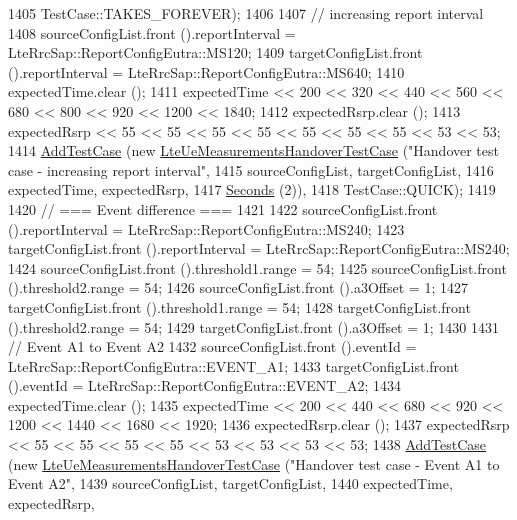\begin{DoxyCode}
1405                TestCase::TAKES\_FOREVER);
1406 
1407   \textcolor{comment}{// increasing report interval}
1408   sourceConfigList.front ().reportInterval = LteRrcSap::ReportConfigEutra::MS120;
1409   targetConfigList.front ().reportInterval = LteRrcSap::ReportConfigEutra::MS640;
1410   expectedTime.clear ();
1411   expectedTime << 200 << 320 << 440 << 560 << 680 << 800 << 920 << 1200 << 1840;
1412   expectedRsrp.clear ();
1413   expectedRsrp << 55 << 55 << 55 << 55 << 55 << 55 << 55 << 53 << 53;
1414   \hyperlink{classns3_1_1TestCase_a3718088e3eefd5d6454569d2e0ddd835}{AddTestCase} (\textcolor{keyword}{new} \hyperlink{classLteUeMeasurementsHandoverTestCase}{LteUeMeasurementsHandoverTestCase} (\textcolor{stringliteral}{"Handover
       test case - increasing report interval"},
1415                                                       sourceConfigList, targetConfigList,
1416                                                       expectedTime, expectedRsrp,
1417                                                       \hyperlink{group__timecivil_ga33c34b816f8ff6628e33d5c8e9713b9e}{Seconds} (2)),
1418                TestCase::QUICK);
1419 
1420   \textcolor{comment}{// === Event difference ===}
1421 
1422   sourceConfigList.front ().reportInterval = LteRrcSap::ReportConfigEutra::MS240;
1423   targetConfigList.front ().reportInterval = LteRrcSap::ReportConfigEutra::MS240;
1424   sourceConfigList.front ().threshold1.range = 54;
1425   sourceConfigList.front ().threshold2.range = 54;
1426   sourceConfigList.front ().a3Offset = 1;
1427   targetConfigList.front ().threshold1.range = 54;
1428   targetConfigList.front ().threshold2.range = 54;
1429   targetConfigList.front ().a3Offset = 1;
1430 
1431   \textcolor{comment}{// Event A1 to Event A2}
1432   sourceConfigList.front ().eventId = LteRrcSap::ReportConfigEutra::EVENT\_A1;
1433   targetConfigList.front ().eventId = LteRrcSap::ReportConfigEutra::EVENT\_A2;
1434   expectedTime.clear ();
1435   expectedTime << 200 << 440 << 680 << 920 << 1200 << 1440 << 1680 << 1920;
1436   expectedRsrp.clear ();
1437   expectedRsrp << 55 << 55 << 55 << 55 << 53 << 53 << 53 << 53;
1438   \hyperlink{classns3_1_1TestCase_a3718088e3eefd5d6454569d2e0ddd835}{AddTestCase} (\textcolor{keyword}{new} \hyperlink{classLteUeMeasurementsHandoverTestCase}{LteUeMeasurementsHandoverTestCase} (\textcolor{stringliteral}{"Handover
       test case - Event A1 to Event A2"},
1439                                                       sourceConfigList, targetConfigList,
1440                                                       expectedTime, expectedRsrp,

\end{DoxyCode}
